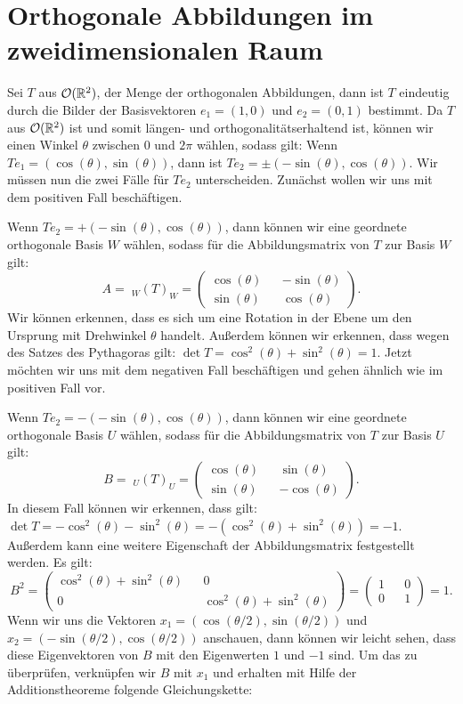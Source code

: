 \section{Orthogonale Abbildungen im zweidimensionalen Raum}
Sei $T$ aus ${\mathcal{O}(\mathbb{R}^2)}$, der Menge der orthogonalen Abbildungen, dann ist $T$ eindeutig durch die Bilder der Basisvektoren $e_1 = (1,0)$ und $e_2 = (0,1)$ bestimmt. Da $T$ aus ${\mathcal{O}(\mathbb{R}^2)}$ ist und somit längen- und orthogonalitätserhaltend ist, können wir einen Winkel $\theta$ zwischen $0$ und $2 \pi$ wählen, sodass gilt: Wenn $Te_1 = (\cos(\theta),\sin(\theta))$, dann ist $Te_2 = \pm (-\sin(\theta),\cos(\theta))$.
Wir müssen nun die zwei Fälle für $Te_2$ unterscheiden. Zunächst wollen wir uns mit dem positiven Fall beschäftigen.

Wenn $Te_2 = + (-\sin(\theta),\cos(\theta))$, dann können wir eine geordnete orthogonale Basis $W$ wählen, sodass für die Abbildungsmatrix von $T$ zur Basis $W$ gilt:
$$A =\;_W\!(T)_W = \begin{pmatrix}
	\cos(\theta) && -\sin(\theta) \\
	\sin(\theta) && \cos(\theta)
\end{pmatrix}. $$
Wir können erkennen, dass es sich um eine Rotation in der Ebene um den Ursprung mit Drehwinkel $\theta$ handelt. Außerdem können wir erkennen, dass wegen des Satzes des Pythagoras gilt: $\det T = \cos^2(\theta) + \sin^2(\theta) = 1$.
Jetzt möchten wir uns mit dem negativen Fall beschäftigen und gehen ähnlich wie im positiven Fall vor.

Wenn $Te_2 = - (-\sin(\theta),\cos(\theta))$, dann können wir eine geordnete orthogonale Basis $U$ wählen, sodass für die Abbildungsmatrix von $T$ zur Basis $U$ gilt:
$$B =\;_U\!(T)_U = \begin{pmatrix}
	\cos(\theta) && \sin(\theta) \\
	\sin(\theta) && -\cos(\theta)
\end{pmatrix}.$$
In diesem Fall können wir erkennen, dass gilt: $\det T = -\cos^2(\theta) -\sin^2(\theta) = -(\cos^2(\theta) +\sin^2(\theta)) = -1$. Außerdem kann eine weitere Eigenschaft der Abbildungsmatrix festgestellt werden. Es gilt:
$$B^2 = \begin{pmatrix}
	\cos^2(\theta) + \sin^2(\theta) && 0 \\
	0 && \cos^2(\theta) + \sin^2(\theta)
\end{pmatrix} = \begin{pmatrix}
	1 && 0 \\
	0 && 1
\end{pmatrix} = 1.
$$Wenn wir uns die Vektoren $x_1 = (\cos(\theta/2),\sin(\theta/2))$ und $x_2 = (-\sin(\theta/2),\cos(\theta/2))$ anschauen, dann können wir leicht sehen, dass diese Eigenvektoren von $B$ mit den Eigenwerten $1$ und $-1$ sind. Um das zu überprüfen, verknüpfen wir $B$ mit $x_1$ und erhalten mit Hilfe der Additionstheoreme folgende Gleichungskette:

